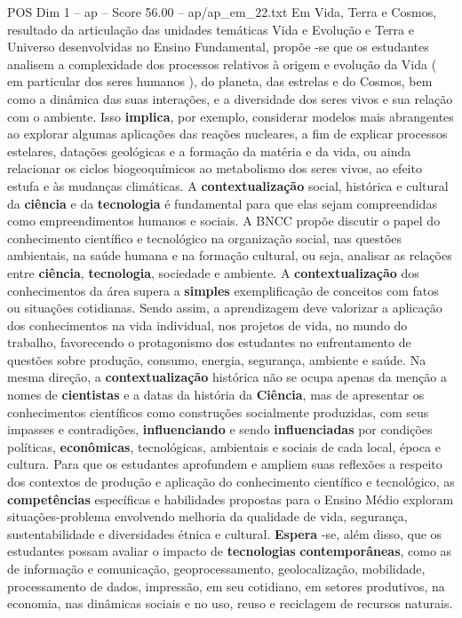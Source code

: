 \begin{textsample}{POS Dim 1 – ap – Score 56.00 – ap/ap\_em\_22.txt}
Em Vida, Terra e Cosmos, resultado da articulação das unidades temáticas Vida e Evolução e Terra e Universo desenvolvidas no Ensino Fundamental, propõe -se que os estudantes analisem a complexidade dos processos relativos à origem e evolução da Vida ( em particular dos seres humanos ), do planeta, das estrelas e do Cosmos, bem como a dinâmica das suas interações, e a diversidade dos seres vivos e sua relação com o ambiente.
Isso \textbf{implica}, por exemplo, considerar modelos mais abrangentes ao explorar algumas aplicações das reações nucleares, a fim de explicar processos estelares, datações geológicas e a formação da matéria e da vida, ou ainda relacionar os ciclos biogeoquímicos ao metabolismo dos seres vivos, ao efeito estufa e às mudanças climáticas.
A \textbf{contextualização} social, histórica e cultural da \textbf{ciência} e da \textbf{tecnologia} é fundamental para que elas sejam compreendidas como empreendimentos humanos e sociais.
A BNCC propõe discutir o papel do conhecimento científico e tecnológico na organização social, nas questões ambientais, na saúde humana e na formação cultural, ou seja, analisar as relações entre \textbf{ciência}, \textbf{tecnologia}, sociedade e ambiente.
A \textbf{contextualização} dos conhecimentos da área supera a \textbf{simples} exemplificação de conceitos com fatos ou situações cotidianas.
Sendo assim, a aprendizagem deve valorizar a aplicação dos conhecimentos na vida individual, nos projetos de vida, no mundo do trabalho, favorecendo o protagonismo dos estudantes no enfrentamento de questões sobre produção, consumo, energia, segurança, ambiente e saúde.
Na mesma direção, a \textbf{contextualização} histórica não se ocupa apenas da menção a nomes de \textbf{cientistas} e a datas da história da \textbf{Ciência}, mas de apresentar os conhecimentos científicos como construções socialmente produzidas, com seus impasses e contradições, \textbf{influenciando} e sendo \textbf{influenciadas} por condições políticas, \textbf{econômicas}, tecnológicas, ambientais e sociais de cada local, época e cultura.
Para que os estudantes aprofundem e ampliem suas reflexões a respeito dos contextos de produção e aplicação do conhecimento científico e tecnológico, as \textbf{competências} específicas e habilidades propostas para o Ensino Médio exploram situações-problema envolvendo melhoria da qualidade de vida, segurança, sustentabilidade e diversidades étnica e cultural. \textbf{Espera} -se, além disso, que os estudantes possam avaliar o impacto de \textbf{tecnologias} \textbf{contemporâneas}, como as de informação e comunicação, geoprocessamento, geolocalização, mobilidade, processamento de dados, impressão, em seu cotidiano, em setores produtivos, na economia, nas dinâmicas sociais e no uso, reuso e reciclagem de recursos naturais.

\end{textsample}
